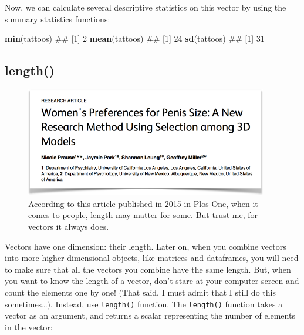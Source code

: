 \documentclass[]{book}
\newenvironment{Shaded}{\begin{snugshade}}{\end{snugshade}}
\newcommand{\KeywordTok}[1]{\textcolor[rgb]{0.13,0.29,0.53}{\textbf{{#1}}}}
\newcommand{\NormalTok}[1]{{#1}}
\theoremstyle{definition}
\theoremstyle{definition}
\theoremstyle{remark}
\begin{document}
Now, we can calculate several descriptive statistics on this vector by
using the summary statistics functions:

\begin{Shaded}
\begin{Highlighting}[]
\KeywordTok{min}\NormalTok{(tattoos)}
\NormalTok{## [1] 2}
\KeywordTok{mean}\NormalTok{(tattoos)}
\NormalTok{## [1] 24}
\KeywordTok{sd}\NormalTok{(tattoos)}
\NormalTok{## [1] 31}
\end{Highlighting}
\end{Shaded}

\subsection{length()}\label{length}

\begin{figure}

{\centering \includegraphics[width=400px]{images/penissize} 

}

\caption{According to this article published in 2015 in Plos One, when it comes to people, length may matter for some. But trust me, for vectors it always does.}\label{fig:unnamed-chunk-105}
\end{figure}

Vectors have one dimension: their length. Later on, when you combine
vectors into more higher dimensional objects, like matrices and
dataframes, you will need to make sure that all the vectors you combine
have the same length. But, when you want to know the length of a vector,
don't stare at your computer screen and count the elements one by one!
(That said, I must admit that I still do this sometimes\ldots{}).
Instead, use \texttt{length()} function. The \texttt{length()} function
takes a vector as an argument, and returns a scalar representing the
number of elements in the vector:
\end{document}
